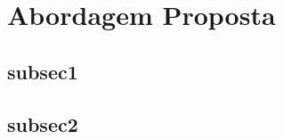 \chapter{Abordagem Proposta}
	\begin{myenv}{1.5}
		
		\section{subsec1}
		\section{subsec2}
		
	\end{myenv}